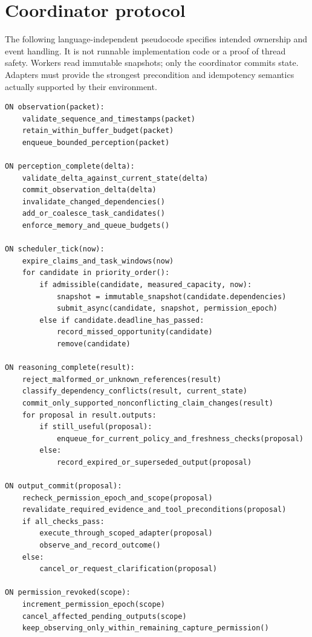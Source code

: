 \documentclass[11pt,letterpaper]{article}
\begin{document}
\clearpage
\appendix
\section{Coordinator protocol}
The following language-independent pseudocode specifies intended ownership and event handling. It is not runnable implementation code or a proof of thread safety. Workers read immutable snapshots; only the coordinator commits state. Adapters must provide the strongest precondition and idempotency semantics actually supported by their environment.

\begin{lstlisting}
ON observation(packet):
    validate_sequence_and_timestamps(packet)
    retain_within_buffer_budget(packet)
    enqueue_bounded_perception(packet)

ON perception_complete(delta):
    validate_delta_against_current_state(delta)
    commit_observation_delta(delta)
    invalidate_changed_dependencies()
    add_or_coalesce_task_candidates()
    enforce_memory_and_queue_budgets()

ON scheduler_tick(now):
    expire_claims_and_task_windows(now)
    for candidate in priority_order():
        if admissible(candidate, measured_capacity, now):
            snapshot = immutable_snapshot(candidate.dependencies)
            submit_async(candidate, snapshot, permission_epoch)
        else if candidate.deadline_has_passed:
            record_missed_opportunity(candidate)
            remove(candidate)

ON reasoning_complete(result):
    reject_malformed_or_unknown_references(result)
    classify_dependency_conflicts(result, current_state)
    commit_only_supported_nonconflicting_claim_changes(result)
    for proposal in result.outputs:
        if still_useful(proposal):
            enqueue_for_current_policy_and_freshness_checks(proposal)
        else:
            record_expired_or_superseded_output(proposal)

ON output_commit(proposal):
    recheck_permission_epoch_and_scope(proposal)
    revalidate_required_evidence_and_tool_preconditions(proposal)
    if all_checks_pass:
        execute_through_scoped_adapter(proposal)
        observe_and_record_outcome()
    else:
        cancel_or_request_clarification(proposal)

ON permission_revoked(scope):
    increment_permission_epoch(scope)
    cancel_affected_pending_outputs(scope)
    keep_observing_only_within_remaining_capture_permission()
\end{lstlisting}
\end{document}
